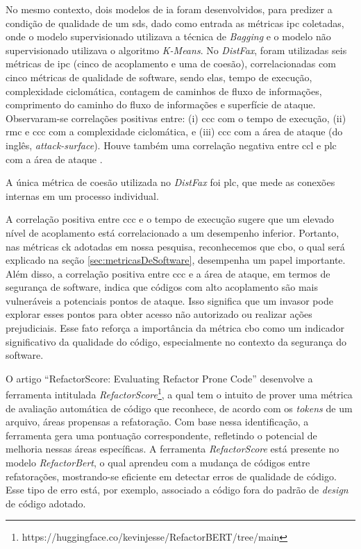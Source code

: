 No mesmo contexto, dois modelos de \gls{ia} foram desenvolvidos, para predizer a condição de qualidade de um \gls{sds}, dado como entrada as métricas \gls{ipc} coletadas, onde o modelo supervisionado utilizava a técnica de \textit{Bagging} e o modelo não supervisionado utilizava o algoritmo \textit{K-Means}. No \textit{DistFax}, foram utilizadas seis métricas de \gls{ipc} (cinco de acoplamento e uma de coesão), correlacionadas com cinco métricas de qualidade de software, sendo elas, tempo de execução, complexidade ciclomática, contagem de caminhos de fluxo de informações, comprimento do caminho do fluxo de informações e superfície de ataque. Observaram-se correlações positivas entre: (i) \gls{ccc} com o tempo de execução, (ii) \gls{rmc} e \gls{ccc} com a complexidade ciclomática, e (iii) \gls{ccc} com a área de ataque (do inglês, \textit{attack-surface}). Houve também uma correlação negativa entre \gls{ccl} e \gls{plc} com a área de ataque \cite{DistFax}.

A única métrica de coesão utilizada no \textit{DistFax} foi \gls{plc}, que mede as conexões internas em um processo individual.

A correlação positiva entre \gls{ccc} e o tempo de execução sugere que um elevado nível de acoplamento está correlacionado a um desempenho inferior. Portanto, nas métricas \gls{ck} adotadas em nossa pesquisa, reconhecemos que \gls{cbo}, o qual será explicado na seção \ref{sec:metricasDeSoftware}, desempenha um papel importante. Além disso, a correlação positiva entre \gls{ccc} e a área de ataque, em termos de segurança de software, indica que códigos com alto acoplamento são mais vulneráveis a potenciais pontos de ataque. Isso significa que um invasor pode explorar esses pontos para obter acesso não autorizado ou realizar ações prejudiciais. Esse fato reforça a importância da métrica \gls{cbo} como um indicador significativo da qualidade do código, especialmente no contexto da segurança do software.

O artigo ``RefactorScore: Evaluating Refactor Prone Code''\cite{KevinJesse:2023} desenvolve a ferramenta intitulada \textit{RefactorScore}\footnote{https://huggingface.co/kevinjesse/RefactorBERT/tree/main}, a qual tem o intuito de prover uma métrica de avaliação automática de código que reconhece, de acordo com os \textit{tokens} de um arquivo, áreas propensas a refatoração. Com base nessa identificação, a ferramenta gera uma pontuação correspondente, refletindo o potencial de melhoria nessas áreas específicas. A ferramenta \textit{RefactorScore} está presente no modelo \textit{RefactorBert}, o qual aprendeu com a mudança de códigos entre refatorações, mostrando-se eficiente em detectar erros de qualidade de código. Esse tipo de erro está, por exemplo, associado a código fora do padrão de \textit{design} de código adotado. 

